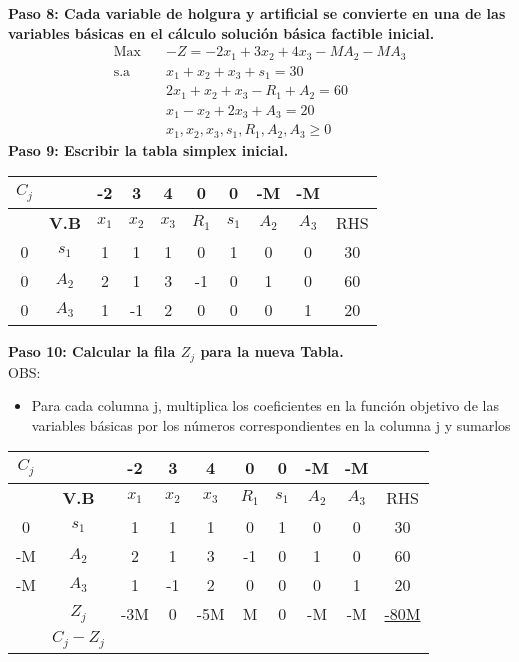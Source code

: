 \documentclass{templateNote}
\begin{document}
\newpage
\noindent
\textbf{Paso 8: Cada variable de holgura y  artificial se convierte en una de las variables básicas en el cálculo solución básica factible inicial.}
\begin{equation*}
    \begin{aligned}
        \text{Max} \quad & -Z = -2x_1 + 3x_2 + 4x_3 - MA_2 - MA_3 \\
        \text{s.a} \quad & x_1 + x_2 + x_3 + s_1 = 30 \\
        & 2x_1 + x_2 + x_3 - R_1 + A_2 = 60 \\
        & x_1 - x_2 + 2x_3 + A_3= 20 \\
        & x_1, x_2, x_3, s_1, R_1, A_2, A_3 \geq 0
    \end{aligned}
\end{equation*}
\textbf{Paso 9: Escribir la tabla simplex inicial.}
\begin{center}
    \begin{tabular}{|c|c|c|c|c|c|c|c|c|c|}
        \hline
        $C_j$ & & -2 & 3 & 4 & 0 & 0 & -M & -M & \\ \hline
        & \textbf{V.B} & $x_1$ & $x_2$ & $x_3$ & $R_1$ & $s_1$ & $A_2$ & $A_3$ & RHS \\ \hline
        0 & $s_1$ & 1 & 1 & 1 & 0 & 1 & 0 & 0 & 30 \\ \hline
        0 & $A_2$ & 2 & 1 & 3 & -1 & 0 & 1 & 0 & 60 \\ \hline
        0 & $A_3$ & 1 & -1 & 2 & 0 & 0 & 0 & 1 & 20 \\ \hline
    \end{tabular}
\end{center}
\textbf{Paso 10: Calcular la fila $Z_j$ para la nueva Tabla.}
\\
OBS:
\begin{itemize}
    \item Para cada columna j, multiplica los coeficientes en la función objetivo de las variables básicas por los números correspondientes en la columna j y sumarlos
\end{itemize}
\begin{center}
    \begin{tabular}{|c|c|c|c|c|c|c|c|c|c|}
        \hline
        $C_j$ & & -2 & 3 & 4 & 0 & 0 & -M & -M & \\ \hline
        & \textbf{V.B} & $x_1$ & $x_2$ & $x_3$ & $R_1$ & $s_1$ & $A_2$ & $A_3$ & RHS \\ \hline
        \cellcolor{green!50}0 & $s_1$ & \cellcolor{green!50}1 & 1 & 1 & 0 & 1 & 0 & 0 & 30 \\ \hline
        \cellcolor{blue!50}-M & $A_2$ & \cellcolor{blue!50}2 & 1 & 3 & -1 & 0 & 1 & 0 & 60 \\ \hline
        \cellcolor{orange!50}-M & $A_3$ & \cellcolor{orange!50}1 & -1 & 2 & 0 & 0 & 0 & 1 & 20 \\ \hline
        & $Z_j$ & \cellcolor{red!50}-3M & 0 & -5M & M & 0 & -M & -M & \underline{-80M} \\ \hline
        & $C_j - Z_j$ & & & & & & & & \\ \hline
    \end{tabular}
\end{center}
\end{document}

